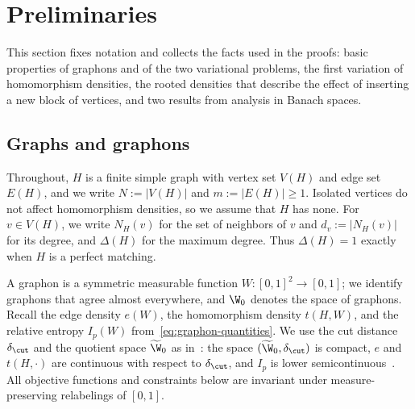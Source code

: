 \section{Preliminaries}\label{sec:preliminaries}

This section fixes notation and collects the facts used in the proofs: basic
properties of graphons and of the two variational problems, the first
variation of homomorphism densities, the rooted densities that describe the
effect of inserting a new block of vertices, and two results from analysis in
Banach spaces.

\subsection{Graphs and graphons}\label{sec:graphons}

Throughout, $H$ is a finite simple graph with vertex set $V(H)$ and edge set
$E(H)$, and we write $N:=|V(H)|$ and $m:=|E(H)|\ge1$.  Isolated vertices do not
affect homomorphism densities, so we assume that $H$ has none.  For $v\in V(H)$,
we write $N_H(v)$ for the set of neighbors of $v$ and $d_v:=|N_H(v)|$ for its
degree, and $\Delta(H)$ for the maximum degree.  Thus $\Delta(H)=1$ exactly
when $H$ is a perfect matching.

A graphon is a symmetric measurable function $W:[0,1]^2\to[0,1]$; we identify
graphons that agree almost everywhere, and $\W_0$ denotes the space of
graphons.  Recall the edge density $e(W)$, the homomorphism density $t(H,W)$,
and the relative entropy $I_p(W)$ from~\eqref{eq:graphon-quantities}.  We use
the cut distance $\delta_\cut$ and the quotient space $\widetilde\W_0$ as
in~\cite{LovaszGraphLimits}: the space $(\widetilde\W_0,\delta_\cut)$ is
compact, $e$ and $t(H,\cdot)$ are continuous with respect to $\delta_\cut$,
and $I_p$ is lower semicontinuous~\cite{ChatterjeeVaradhanLDP}.  All objective
functions and constraints below are invariant under measure-preserving
relabelings of $[0,1]$.

